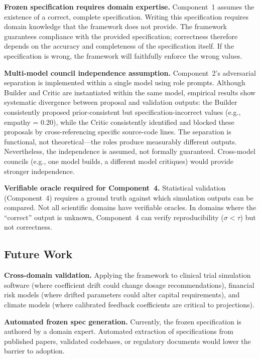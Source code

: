 \documentclass[11pt,a4paper]{article}
\begin{document}
\textbf{Frozen specification requires domain expertise.} Component~1 assumes the existence of a correct, complete specification. Writing this specification requires domain knowledge that the framework does not provide. The framework guarantees compliance with the provided specification; correctness therefore depends on the accuracy and completeness of the specification itself. If the specification is wrong, the framework will faithfully enforce the wrong values.

\textbf{Multi-model council independence assumption.} Component~2's adversarial separation is implemented within a single model using role prompts. Although Builder and Critic are instantiated within the same model, empirical results show systematic divergence between proposal and validation outputs: the Builder consistently proposed prior-consistent but specification-incorrect values (e.g., empathy = 0.20), while the Critic consistently identified and blocked these proposals by cross-referencing specific source-code lines. The separation is functional, not theoretical---the roles produce measurably different outputs. Nevertheless, the independence is assumed, not formally guaranteed. Cross-model councils (e.g., one model builds, a different model critiques) would provide stronger independence.

\textbf{Verifiable oracle required for Component~4.} Statistical validation (Component~4) requires a ground truth against which simulation outputs can be compared. Not all scientific domains have verifiable oracles. In domains where the ``correct'' output is unknown, Component~4 can verify reproducibility ($\sigma < \tau$) but not correctness.

\subsection{Future Work}

\textbf{Cross-domain validation.} Applying the framework to clinical trial simulation software (where coefficient drift could change dosage recommendations), financial risk models (where drifted parameters could alter capital requirements), and climate models (where calibrated feedback coefficients are critical to projections).

\textbf{Automated frozen spec generation.} Currently, the frozen specification is authored by a domain expert. Automated extraction of specifications from published papers, validated codebases, or regulatory documents would lower the barrier to adoption.
\end{document}
